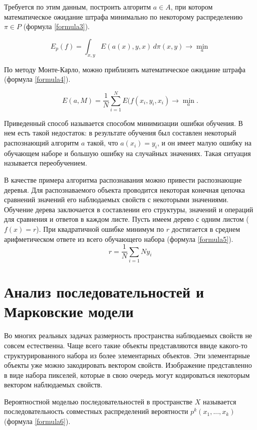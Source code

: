 Требуется по этим данным, построить алгоритм $a \in A$, при котором математическое ожидание штрафа минимально по некоторому распределению $\pi \in P$ (формула \ref{formula3}).

\begin{equation}
E_p(f) = \int_{x, y} E(a(x), y, x) \, d \pi (x, y) \to \min_a
\label{formula3}
\end{equation}

По методу Монте-Карло, можно приблизить математическое ожидание штрафа (формула \ref{formula4}).

\begin{equation}
E(a, M) = \frac{1}{N} \sum_{i=1}^{N}E(f(x_i, y_i, x_i) \to \min_a.
\label{formula4}
\end{equation}

Приведенный способ называется способом минимизации ошибки обучения. В нем есть такой недостаток: в результате обучения был составлен некоторый распознающий алгоритм $a$ такой, что $a(x_i) = y_i$, и он имеет малую ошибку на обучающем наборе и большую ошибку на случайных значениях. Такая ситуация называется переобучением.

В качестве примера алгоритма распознавания можно привести распознающие деревья. Для распознаваемого объекта проводится некоторая конечная цепочка сравнений значений его наблюдаемых свойств с некоторыми значениями. Обучение дерева заключается в составлении его структуры, значений и операций для сравнения и ответов в каждом листе. Пусть имеем дерево с одним листом ($f(x) = r$). При квадратичной ошибке минимум по $r$ достигается в среднем арифметическом ответе из всего обучающего набора (формула \ref{formula5}).
\begin{equation}
r = \frac{1}{N}\sum_{i=1}{N}y_i
\label{formula5}
\end{equation}

\chapter{Анализ последовательностей и Марковские модели}
Во многих реальных задачах размерность пространства наблюдаемых свойств не совсем естественна. Чаще всего такие объекты представляются ввиде какого-то структурированного набора из более элементарных объектов. Эти элементарные объекты уже можно закодировать вектором свойств. Изображение представленно в виде набора пикселей, которые в свою очередь могут кодироваться некоторым вектором наблюдаемых свойств.

Вероятностной моделью последовательностей в пространстве $X$ называется последовательность совместных распределений вероятности $p^k(x_1, ..., x_k)$ (формула \ref{formula6}).

